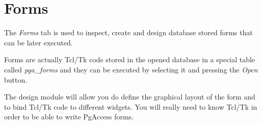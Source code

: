\section{Forms}
The \emph{Forms} tab is used to inspect, create and design
database stored forms that can be later executed.

Forms are actually Tcl/Tk code stored in the opened database in a special table called
\emph{pga\_forms} and they can be executed by selecting it and pressing the
\emph{Open} button.

The design module will allow you do define the graphical layout of the form and
to bind Tcl/Tk code to different widgets. You will really need to know Tcl/Tk in
order to be able to write PgAccess forms.

\topics
    \topic {}